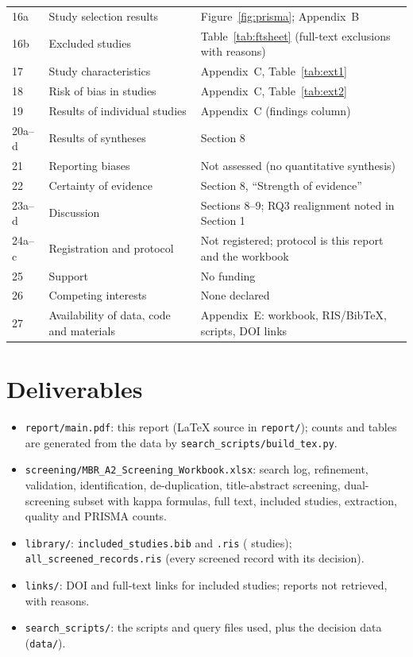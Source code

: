 {\begin{longtable}{@{}P{0.9cm}P{5.6cm}P{9.4cm}@{}}
16a & Study selection results & Figure~\ref{fig:prisma}; Appendix~B \\
16b & Excluded studies & Table~\ref{tab:ftsheet} (full-text exclusions with reasons) \\
17 & Study characteristics & Appendix~C, Table~\ref{tab:ext1} \\
18 & Risk of bias in studies & Appendix~C, Table~\ref{tab:ext2} \\
19 & Results of individual studies & Appendix~C (findings column) \\
20a--d & Results of syntheses & Section 8 \\
21 & Reporting biases & Not assessed (no quantitative synthesis) \\
22 & Certainty of evidence & Section 8, ``Strength of evidence'' \\
23a--d & Discussion & Sections 8--9; RQ3 realignment noted in Section 1 \\
24a--c & Registration and protocol & Not registered; protocol is this report and the workbook \\
25 & Support & No funding \\
26 & Competing interests & None declared \\
27 & Availability of data, code and materials & Appendix~E: workbook, RIS/BibTeX, scripts, DOI links \\
\end{longtable}}

\section{Deliverables}
\begin{itemize}
\item \texttt{report/main.pdf}: this report (LaTeX source in \texttt{report/}); counts and tables are generated from the data by \texttt{search\_scripts/build\_tex.py}.
\item \texttt{screening/MBR\_A2\_Screening\_Workbook.xlsx}: search log, refinement, validation, identification, de-duplication, title-abstract screening, dual-screening subset with kappa formulas, full text, included studies, extraction, quality and PRISMA counts.
\item \texttt{library/}: \texttt{included\_studies.bib} and \texttt{.ris} (\totalIncluded{} studies); \texttt{all\_screened\_records.ris} (every screened record with its decision).
\item \texttt{links/}: DOI and full-text links for included studies; reports not retrieved, with reasons.
\item \texttt{search\_scripts/}: the scripts and query files used, plus the decision data (\texttt{data/}).
\end{itemize}

